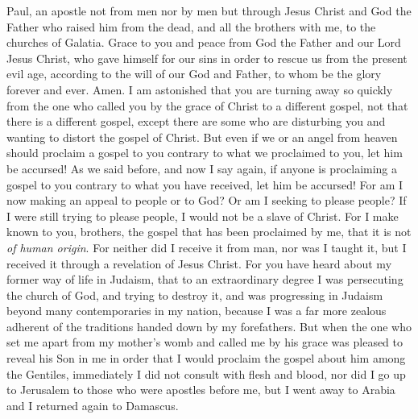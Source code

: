 
\begin{biblechapter} %
 Paul, an apostle not from men nor by men but through Jesus Christ and God the Father who raised him from the dead,
\verse and all the brothers with me, to the churches of Galatia.
\verse Grace to you and peace from God the Father and our Lord Jesus Christ,
\verse who gave himself for our sins in order to rescue us from the present evil age, according to the will of our God and Father,
\verse to whom be the glory forever and ever. Amen.
 I am astonished that you are turning away so quickly from the one who called you by the grace of Christ to a different gospel,
\verse not that there is a different gospel, except there are some who are disturbing you and wanting to distort the gospel of Christ.
\verse But even if we or an angel from heaven should proclaim a gospel to you contrary to what we proclaimed to you, let him be accursed!
\verse As we said before, and now I say again, if anyone is proclaiming a gospel to you contrary to what you have received, let him be accursed!
\verse For am I now making an appeal to people or to God? Or am I seeking to please people? If I were still trying to please people, I would not be a slave of Christ.
 For I make known to you, brothers, the gospel that has been proclaimed by me, that it is not \textit{of human origin}.
\verse For neither did I receive it from man, nor was I taught it, but I received it through a revelation of Jesus Christ.
\verse For you have heard about my former way of life in Judaism, that to an extraordinary degree I was persecuting the church of God, and trying to destroy it,
\verse and was progressing in Judaism beyond many contemporaries in my nation, because I was a far more zealous adherent of the traditions handed down by my forefathers.
\verse But when the one who set me apart from my mother’s womb and called me by his grace was pleased
\verse to reveal his Son in me in order that I would proclaim the gospel about him among the Gentiles, immediately I did not consult with flesh and blood,
\verse nor did I go up to Jerusalem to those who were apostles before me, but I went away to Arabia and I returned again to Damascus.

\end{biblechapter}
